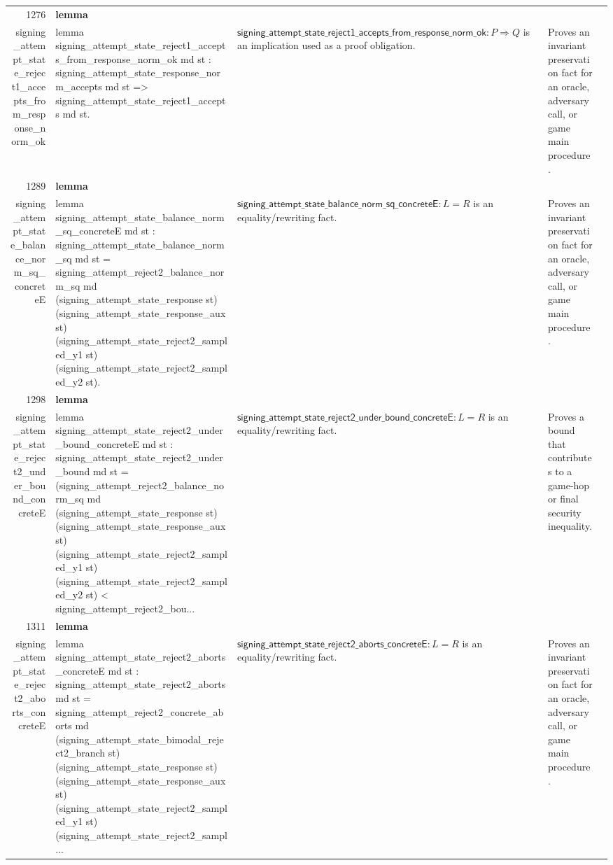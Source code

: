 \documentclass[10pt]{article}
\newcommand{\ec}[1]{\begingroup\ttfamily\scriptsize #1\endgroup}
\begin{document}
\begin{longtable}{r L{0.17\textwidth} L{0.26\textwidth} L{0.27\textwidth} L{0.20\textwidth}}
1276 & \textbf{lemma}\\\ec{signing\_attempt\_state\_reject1\_accepts\_from\_response\_norm\_ok} & \ec{lemma signing\_attempt\_state\_reject1\_accepts\_from\_response\_norm\_ok md st : signing\_attempt\_state\_response\_norm\_accepts md st => signing\_attempt\_state\_reject1\_accepts md st.} & \(\mathsf{signing\_attempt\_state\_reject1\_accepts\_from\_response\_norm\_ok} : P \Rightarrow Q\) is an implication used as a proof obligation. & Proves an invariant preservation fact for an oracle, adversary call, or game main procedure. \\
1289 & \textbf{lemma}\\\ec{signing\_attempt\_state\_balance\_norm\_sq\_concreteE} & \ec{lemma signing\_attempt\_state\_balance\_norm\_sq\_concreteE md st : signing\_attempt\_state\_balance\_norm\_sq md st = signing\_attempt\_reject2\_balance\_norm\_sq md (signing\_attempt\_state\_response st) (signing\_attempt\_state\_response\_aux st) (signing\_attempt\_state\_reject2\_sampled\_y1 st) (signing\_attempt\_state\_reject2\_sampled\_y2 st).} & \(\mathsf{signing\_attempt\_state\_balance\_norm\_sq\_concreteE} : L = R\) is an equality/rewriting fact. & Proves an invariant preservation fact for an oracle, adversary call, or game main procedure. \\
1298 & \textbf{lemma}\\\ec{signing\_attempt\_state\_reject2\_under\_bound\_concreteE} & \ec{lemma signing\_attempt\_state\_reject2\_under\_bound\_concreteE md st : signing\_attempt\_state\_reject2\_under\_bound md st = (signing\_attempt\_reject2\_balance\_norm\_sq md (signing\_attempt\_state\_response st) (signing\_attempt\_state\_response\_aux st) (signing\_attempt\_state\_reject2\_sampled\_y1 st) (signing\_attempt\_state\_reject2\_sampled\_y2 st) < signing\_attempt\_reject2\_bou...} & \(\mathsf{signing\_attempt\_state\_reject2\_under\_bound\_concreteE} : L = R\) is an equality/rewriting fact. & Proves a bound that contributes to a game-hop or final security inequality. \\
1311 & \textbf{lemma}\\\ec{signing\_attempt\_state\_reject2\_aborts\_concreteE} & \ec{lemma signing\_attempt\_state\_reject2\_aborts\_concreteE md st : signing\_attempt\_state\_reject2\_aborts md st = signing\_attempt\_reject2\_concrete\_aborts md (signing\_attempt\_state\_bimodal\_reject2\_branch st) (signing\_attempt\_state\_response st) (signing\_attempt\_state\_response\_aux st) (signing\_attempt\_state\_reject2\_sampled\_y1 st) (signing\_attempt\_state\_reject2\_sampl...} & \(\mathsf{signing\_attempt\_state\_reject2\_aborts\_concreteE} : L = R\) is an equality/rewriting fact. & Proves an invariant preservation fact for an oracle, adversary call, or game main procedure. \\

\end{longtable}
\end{document}
